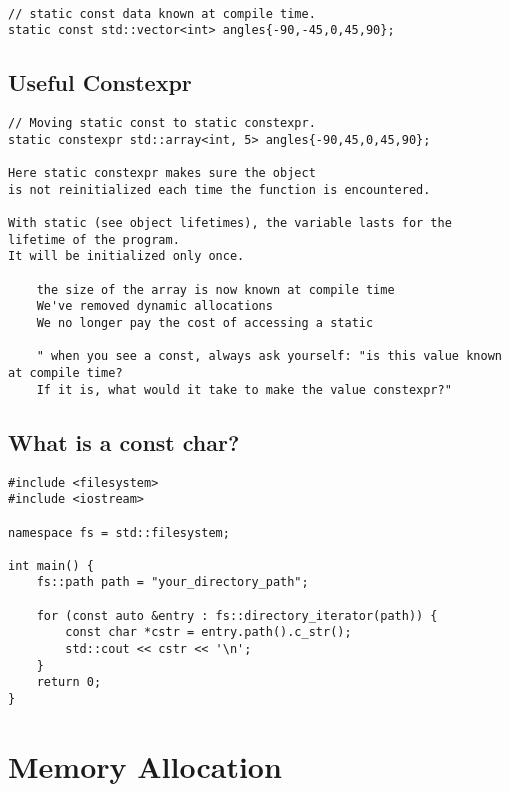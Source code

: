 \begin{verbatim}

// static const data known at compile time. 
static const std::vector<int> angles{-90,-45,0,45,90};
\end{verbatim}

\subsection{Useful Constexpr}

\begin{verbatim}
// Moving static const to static constexpr.
static constexpr std::array<int, 5> angles{-90,45,0,45,90};

Here static constexpr makes sure the object
is not reinitialized each time the function is encountered.

With static (see object lifetimes), the variable lasts for the lifetime of the program.
It will be initialized only once. 

    the size of the array is now known at compile time
    We've removed dynamic allocations
    We no longer pay the cost of accessing a static

    " when you see a const, always ask yourself: "is this value known at compile time? 
    If it is, what would it take to make the value constexpr?" 
\end{verbatim}

\subsection{What is a const char?}

\begin{verbatim}
#include <filesystem>
#include <iostream>

namespace fs = std::filesystem;

int main() {
    fs::path path = "your_directory_path";

    for (const auto &entry : fs::directory_iterator(path)) {
        const char *cstr = entry.path().c_str();
        std::cout << cstr << '\n';
    }
    return 0;
}
\end{verbatim}

\section{Memory Allocation}

